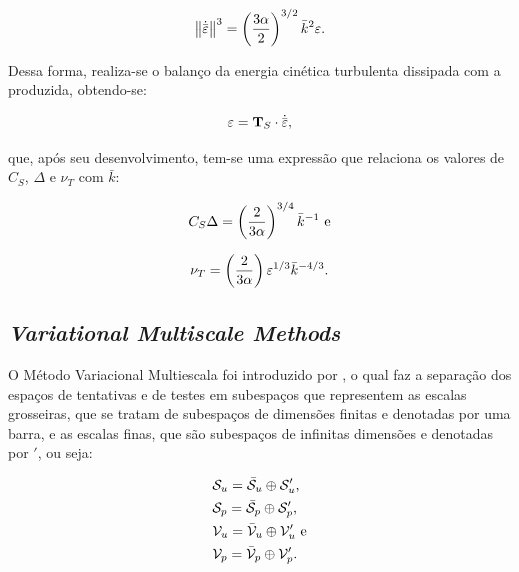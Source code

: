 \documentclass[_ArquivoPrincipal.tex]{subfiles}
\begin{document}
\begin{equation}
    \left\lVert{\dot{\bar{\mathbf{\varepsilon}}}}\right\lVert^3=\left({\frac{3\alpha}{2}}\right)^{3/2}\bar{k}^2\varepsilon\text{.}
\end{equation}

Dessa forma, realiza-se o balanço da energia cinética turbulenta dissipada com a produzida, obtendo-se:

\begin{equation}
    \varepsilon=\mathbf{T}_S\cdot\dot{\bar{\mathbf{\varepsilon}}}\text{,}
\end{equation}

\noindent que, após seu desenvolvimento, tem-se uma expressão que relaciona os valores de $C_S$, $\Delta$ e $\nu_T$ com $\bar{k}$:

\begin{equation}
    C_S\Delta=\left({\frac{2}{3\alpha}}\right)^{3/4}\bar{k}^{-1}\text{ e}
\end{equation}

\begin{equation}
    \nu_T=\left({\frac{2}{3\alpha}}\right)\varepsilon^{1/3}\bar{k}^{-4/3}\text{.}
\end{equation}

\subsection{\textit{Variational Multiscale Methods}} \label{VMS}

O Método Variacional Multiescala foi introduzido por , o qual faz a separação dos espaços de tentativas e de testes em subespaços que representem as escalas grosseiras, que se tratam de subespaços de dimensões finitas e denotadas por uma barra, e as escalas finas, que são subespaços de infinitas dimensões e denotadas por $'$, ou seja:

\begin{subequations}
    \begin{align}
        &\mathcal{S}_u=\bar{\mathcal{S}}_u\oplus\mathcal{S}'_u\text{,}\\
        &\mathcal{S}_p=\bar{\mathcal{S}}_p\oplus\mathcal{S}'_p\text{,}\\
        &\mathcal{V}_u=\bar{\mathcal{V}}_u\oplus\mathcal{V}'_u\text{ e}\\
        &\mathcal{V}_p=\bar{\mathcal{V}}_p\oplus\mathcal{V}'_p\text{.}
    \end{align}
\end{subequations}
\end{document}
